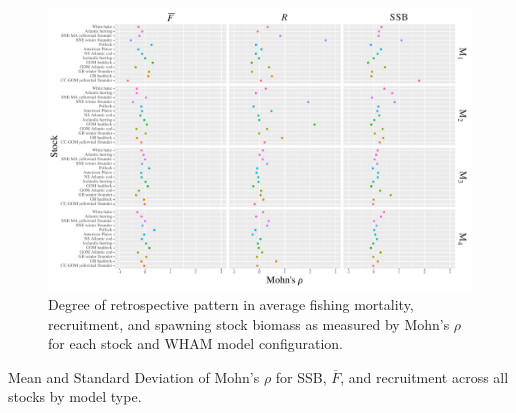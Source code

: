\documentclass[12pt,letterpaper, leqno]{article}
\begin{document}
\begin{landscape}
\begin{figure}
\caption{Degree of retrospective pattern in average fishing mortality, recruitment, and spawning stock biomass as measured by Mohn's $\rho$ for each stock and WHAM model configuration.}\label{wham_rho_paper_plot}
\begin{center}
\includegraphics[height = 0.9\textheight]{../db/wham_rho_paper_plot.pdf}
\end{center}
\end{figure}
\end{landscape}

\clearpage


\begin{table}
\begin{center}
\caption{Mean and Standard Deviation of Mohn's $\rho$ for SSB, $\overline{F}$, and recruitment across all stocks by model type.}\label{model_compare}

\end{center}
\end{table}
\end{document}
